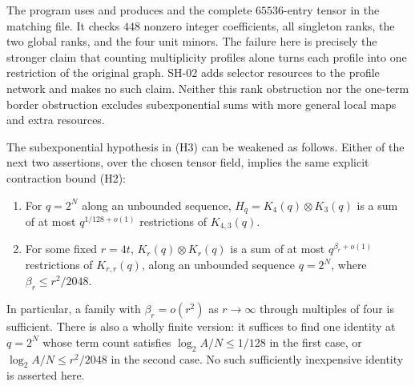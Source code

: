 The program 
uses 
and produces 
and the complete $65536$-entry tensor in the matching
 file.  It checks $448$ nonzero integer
coefficients, all singleton ranks, the two global ranks,
and the four unit minors.  The failure here is precisely
the stronger claim that counting multiplicity profiles
alone turns each profile into one restriction of the
original graph.  SH-02 adds selector resources to the
profile network and makes no such claim.  Neither this
rank obstruction nor the one-term border obstruction
excludes subexponential sums with more general local maps
and extra resources.

\begin{proposition}
\label{prop:positive-overhead-gates}
The subexponential hypothesis in (H3) can be weakened as follows.
Either of the next two assertions, over the chosen tensor field,
implies the same explicit contraction bound (H2):
\begin{enumerate}
\item For $q=2^N$ along an unbounded sequence, $H_q=K_4(q)
\otimes K_3(q)$ is a sum of at most
$q^{1/128+o(1)}$ restrictions of $K_{4,3}(q)$.
\item For some fixed $r=4t$, $K_r(q)\otimes K_r(q)$ is
a sum of at most $q^{\beta_r+o(1)}$ restrictions of
$K_{r,r}(q)$, along an unbounded sequence $q=2^N$, where
$\beta_r\le r^2/2048$.
\end{enumerate}
In particular, a family with $\beta_r=o(r^2)$ as
$r\to\infty$ through multiples of four is sufficient.
There is also a wholly finite version: it suffices to
find one identity at $q=2^N$ whose term count satisfies
$\log_2 A/N\le1/128$ in the first case, or
$\log_2 A/N\le r^2/2048$ in the second case.
No such sufficiently inexpensive identity is asserted here.
\end{proposition}
